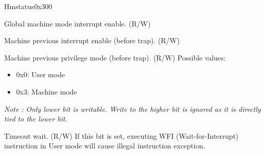 \begin{register}{H}{mstatus}{0x300}\label{regdesc:MSTATUS}
%
%
%
%
%
%
%
%
%
\regnewline%
\begin{regdesc}\begin{reglist}
\label{fielddesc:MSTATUSMIE}\item [MIE] Global machine mode interrupt enable. (R/W)
\label{fielddesc:MSTATUSMPIE}\item [MPIE] Machine previous interrupt enable (before trap). (R/W)
\label{fielddesc:MSTATUSMPP}\item [MPP] Machine previous privilege mode (before trap). (R/W)
\newline Possible values:
\begin{itemize}
    \setlength\itemsep{-1em}
    \item 0x0: User mode
    \item 0x3: Machine mode
\end{itemize}
\textit{Note : Only lower bit is writable. Write to the higher bit is ignored as it is directly tied to the lower bit.}
\label{fielddesc:MSTATUSTW}\item [TW] Timeout wait. (R/W)
\newline If this bit is set, executing WFI (Wait-for-Interrupt) instruction in User mode will cause illegal instruction exception.
\end{reglist}\end{regdesc}
\end{register}

